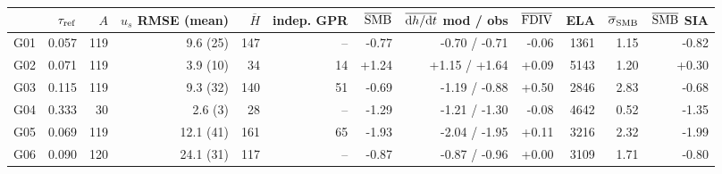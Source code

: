 \begin{tabular}{lrrrrrrrrrrr}
\toprule
 & $\tau_{\rm ref}$ & $A$ & $u_s$ RMSE (mean) & $\overline{H}$ & indep. GPR & $\overline{\rm SMB}$ & $\overline{{\rm d}h/{\rm d}t}$ mod / obs & $\overline{\rm FDIV}$ & ELA & $\overline{\sigma}_{\rm SMB}$ & $\overline{\rm SMB}$ SIA \\
\midrule
G01 & 0.057 & 119 & 9.6 (25) & 147 & -- & -0.77 & -0.70 / -0.71 & -0.06 & 1361 & 1.15 & -0.82 \\
G02 & 0.071 & 119 & 3.9 (10) & 34 & 14 & +1.24 & +1.15 / +1.64 & +0.09 & 5143 & 1.20 & +0.30 \\
G03 & 0.115 & 119 & 9.3 (32) & 140 & 51 & -0.69 & -1.19 / -0.88 & +0.50 & 2846 & 2.83 & -0.68 \\
G04 & 0.333 & 30 & 2.6 (3) & 28 & -- & -1.29 & -1.21 / -1.30 & -0.08 & 4642 & 0.52 & -1.35 \\
G05 & 0.069 & 119 & 12.1 (41) & 161 & 65 & -1.93 & -2.04 / -1.95 & +0.11 & 3216 & 2.32 & -1.99 \\
G06 & 0.090 & 120 & 24.1 (31) & 117 & -- & -0.87 & -0.87 / -0.96 & +0.00 & 3109 & 1.71 & -0.80 \\
\bottomrule
\end{tabular}
